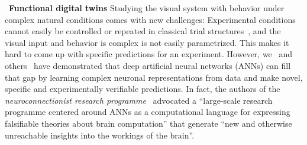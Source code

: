 \documentclass[COG,11pt]{ercgrant}
\begin{document}
~\textbf{Functional digital twins} Studying the visual system with behavior under complex natural conditions comes with new challenges:
Experimental conditions cannot easily be controlled or repeated in classical trial structures~\parencite{Huk2018-ez}, and the visual input and behavior is complex is not easily parametrized. 
This makes it hard to come up with specific predictions for an experiment. 
However, we~\parencite{Walker2019-yw, Cobos2022-rr, Franke2022-do} and others~\parencite{Bashivan2019-ry, Ponce2019-yn, Hofling2022-wr} have demonstrated that deep artificial neural networks (ANNs) can fill that gap by learning complex neuronal representations from data and make novel, specific and experimentally verifiable predictions. 
In fact, the authors of the \textit{neuroconnectionist research programme}~\parencite{Doerig2022-ex} advocated a ``large-scale research programme centered around ANNs as a computational language for expressing falsifiable theories about brain computation'' that generate ``new and otherwise unreachable insights into the workings of the brain''. 
\end{document}
